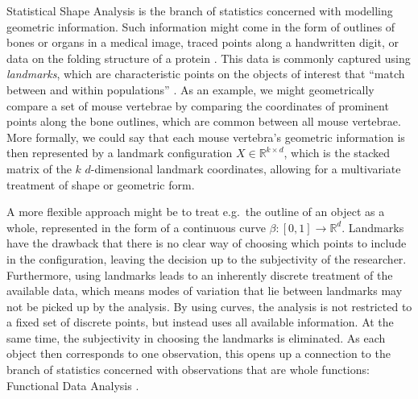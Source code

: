 \label{sec:1}
Statistical Shape Analysis  is the branch of statistics concerned with modelling geometric information.
Such information might come in the form of outlines of bones or organs in a medical image, traced points along a handwritten digit, or data on the folding structure of a protein \parencite[see e.g.][Chap.\ 1]{DrydenMardia2016}.
This data is commonly captured using \emph{landmarks}, which are characteristic points on the objects of interest that \enquote{match between and within populations} \parencite[3]{DrydenMardia2016}.
As an example, we might geometrically compare a set of mouse vertebrae by comparing the coordinates of prominent points along the bone outlines, which are common between all mouse vertebrae.
More formally, we could say that each mouse vertebra's geometric information is then represented by a landmark configuration $X \in \mathbb{R}^{k \times d}$, which is the stacked matrix of the $k$ $d$-dimensional landmark coordinates, allowing for a multivariate treatment of shape or geometric form.

A more flexible approach might be to treat e.g.\ the outline of an object as a whole, represented in the form of a continuous curve $\beta : [0,1] \rightarrow \mathbb{R}^d$. 
Landmarks have the drawback that there is no clear way of choosing which points to include in the configuration, leaving the decision up to the subjectivity of the researcher. 
Furthermore, using landmarks leads to an inherently discrete treatment of the available data, which means modes of variation that lie between landmarks may not be picked up by the analysis.  
By using curves, the analysis is not restricted to a fixed set of discrete points, but instead uses all available information.
At the same time, the subjectivity in choosing the landmarks is eliminated.
As each object then corresponds to one observation, this opens up a connection to the branch of statistics concerned with observations that are whole functions: Functional Data Analysis \parencite[see e.g.][]{RamsaySilverman2005,WangChiouMueller2016}.

